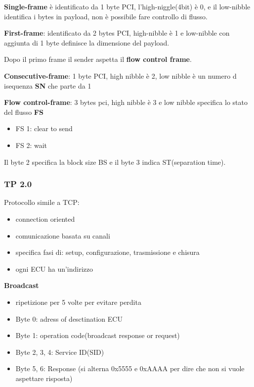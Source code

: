 \textbf{Single-frame} è identificato da 1 byte PCI, l'high-niggle(4bit) è 0, e il low-nibble identifica i bytes in payload, non è possibile fare controllo di flusso.

\textbf{First-frame}: identificato da 2 bytes PCI, high-nibble è 1 e low-nibble con aggiunta di 1 byte definisce la dimensione del payload.

Dopo il primo frame il sender aspetta il \textbf{flow control frame}.

\textbf{Consecutive-frame}: 1 byte PCI, high nibble è 2, low nibble è un numero d isequenza \textbf{SN} che parte da 1

\textbf{Flow control-frame}: 3 bytes pci, high nibble è 3 e low nibble specifica lo stato del flusso \textbf{FS}
\begin{itemize}
  \item FS 1: clear to send
  \item FS 2: wait
\end{itemize}

Il byte 2 specifica la block size BS e il byte 3 indica ST(separation time).




\subsubsection{TP 2.0}
Protocollo simile a TCP:
\begin{itemize}
  \item connection oriented
  \item comunicazione basata su canali
  \item specifica fasi di: setup, configurazione, trasmissione e chisura
  \item ogni ECU ha un'indirizzo
\end{itemize}




\textbf{Broadcast}
\begin{itemize}
  \item ripetizione per 5 volte per evitare perdita
  \item Byte 0: adress of desctination ECU
  \item Byte 1: operation code(broadcast response or request)
  \item Byte 2, 3, 4: Service ID(SID) 
  \item Byte 5, 6: Response (si alterna 0x5555 e 0xAAAA per dire che non si vuole aspettare risposta)
\end{itemize}



